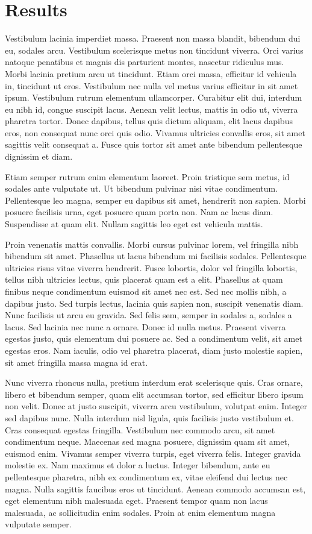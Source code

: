 \section{Results}
Vestibulum lacinia imperdiet massa. Praesent non massa blandit, bibendum dui eu, sodales arcu. Vestibulum scelerisque metus non tincidunt viverra. Orci varius natoque penatibus et magnis dis parturient montes, nascetur ridiculus mus. Morbi lacinia pretium arcu ut tincidunt. Etiam orci massa, efficitur id vehicula in, tincidunt ut eros. Vestibulum nec nulla vel metus varius efficitur in sit amet ipsum. Vestibulum rutrum elementum ullamcorper. Curabitur elit dui, interdum eu nibh id, congue suscipit lacus. Aenean velit lectus, mattis in odio ut, viverra pharetra tortor. Donec dapibus, tellus quis dictum aliquam, elit lacus dapibus eros, non consequat nunc orci quis odio. Vivamus ultricies convallis eros, sit amet sagittis velit consequat a. Fusce quis tortor sit amet ante bibendum pellentesque dignissim et diam.

Etiam semper rutrum enim elementum laoreet. Proin tristique sem metus, id sodales ante vulputate ut. Ut bibendum pulvinar nisi vitae condimentum. Pellentesque leo magna, semper eu dapibus sit amet, hendrerit non sapien. Morbi posuere facilisis urna, eget posuere quam porta non. Nam ac lacus diam. Suspendisse at quam elit. Nullam sagittis leo eget est vehicula mattis.

Proin venenatis mattis convallis. Morbi cursus pulvinar lorem, vel fringilla nibh bibendum sit amet. Phasellus ut lacus bibendum mi facilisis sodales. Pellentesque ultricies risus vitae viverra hendrerit. Fusce lobortis, dolor vel fringilla lobortis, tellus nibh ultricies lectus, quis placerat quam est a elit. Phasellus at quam finibus neque condimentum euismod sit amet nec est. Sed nec mollis nibh, a dapibus justo. Sed turpis lectus, lacinia quis sapien non, suscipit venenatis diam. Nunc facilisis ut arcu eu gravida. Sed felis sem, semper in sodales a, sodales a lacus. Sed lacinia nec nunc a ornare. Donec id nulla metus. Praesent viverra egestas justo, quis elementum dui posuere ac. Sed a condimentum velit, sit amet egestas eros. Nam iaculis, odio vel pharetra placerat, diam justo molestie sapien, sit amet fringilla massa magna id erat.

Nunc viverra rhoncus nulla, pretium interdum erat scelerisque quis. Cras ornare, libero et bibendum semper, quam elit accumsan tortor, sed efficitur libero ipsum non velit. Donec at justo suscipit, viverra arcu vestibulum, volutpat enim. Integer sed dapibus nunc. Nulla interdum nisl ligula, quis facilisis justo vestibulum et. Cras consequat egestas fringilla. Vestibulum nec commodo arcu, sit amet condimentum neque. Maecenas sed magna posuere, dignissim quam sit amet, euismod enim. Vivamus semper viverra turpis, eget viverra felis. Integer gravida molestie ex. Nam maximus et dolor a luctus. Integer bibendum, ante eu pellentesque pharetra, nibh ex condimentum ex, vitae eleifend dui lectus nec magna. Nulla sagittis faucibus eros ut tincidunt. Aenean commodo accumsan est, eget elementum nibh malesuada eget. Praesent tempor quam non lacus malesuada, ac sollicitudin enim sodales. Proin at enim elementum magna vulputate semper.

